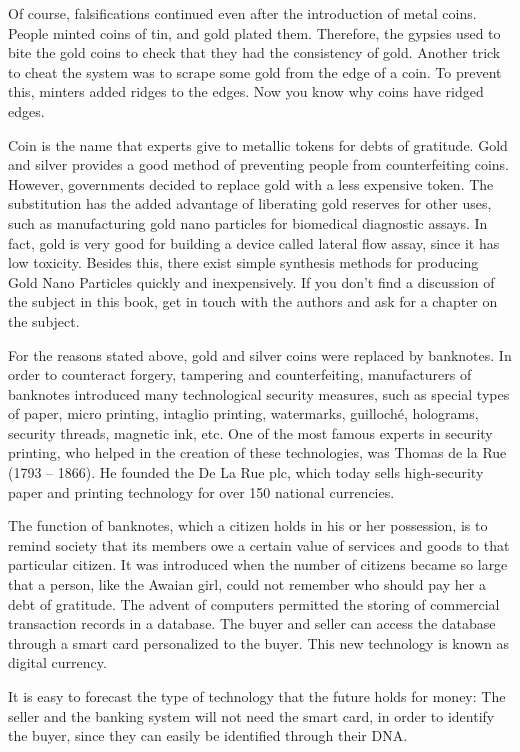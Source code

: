 \documentclass[
  12pt,
]{book}
\begin{document}
Of course, falsifications continued even after the introduction of metal
coins. People minted coins of tin, and gold plated them. Therefore, the
gypsies used to bite the gold coins to check that they had the
consistency of gold. Another trick to cheat the system was to scrape
some gold from the edge of a coin. To prevent this, minters added ridges
to the edges. Now you know why coins have ridged edges.

Coin is the name that experts give to metallic tokens for debts of
gratitude. Gold and silver provides a good method of preventing people
from counterfeiting coins. However, governments decided to replace gold
with a less expensive token. The substitution has the added advantage of
liberating gold reserves for other uses, such as manufacturing gold nano
particles for biomedical diagnostic assays. In fact, gold is very good
for building a device called lateral flow assay, since it has low
toxicity. Besides this, there exist simple synthesis methods for
producing Gold Nano Particles quickly and inexpensively. If you don't
find a discussion of the subject in this book, get in touch with the
authors and ask for a chapter on the subject.

For the reasons stated above, gold and silver coins were replaced by
banknotes. In order to counteract forgery, tampering and counterfeiting,
manufacturers of banknotes introduced many technological security
measures, such as special types of paper, micro printing, intaglio
printing, watermarks, guilloché, holograms, security threads, magnetic
ink, etc. One of the most famous experts in security printing, who
helped in the creation of these technologies, was Thomas de la Rue (1793
-- 1866). He founded the De La Rue plc, which today sells high-security
paper and printing technology for over 150 national currencies.

The function of banknotes, which a citizen holds in his or her
possession, is to remind society that its members owe a certain value of
services and goods to that particular citizen. It was introduced when
the number of citizens became so large that a person, like the Awaian
girl, could not remember who should pay her a debt of gratitude. The
advent of computers permitted the storing of commercial transaction
records in a database. The buyer and seller can access the database
through a smart card personalized to the buyer. This new technology is
known as digital currency.

It is easy to forecast the type of technology that the future holds for
money: The seller and the banking system will not need the smart card,
in order to identify the buyer, since they can easily be identified
through their DNA.
\end{document}
